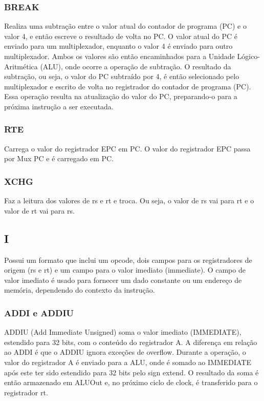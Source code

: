 \subsubsection{BREAK}

Realiza uma subtração entre o valor atual do contador de programa (PC) e o valor 4, e então escreve o resultado de volta no PC. O valor atual do PC é enviado para um multiplexador, enquanto o valor 4 é enviado para outro multiplexador. Ambos os valores são então encaminhados para a Unidade Lógico-Aritmética (ALU), onde ocorre a operação de subtração. O resultado da subtração, ou seja, o valor do PC subtraído por 4, é então selecionado pelo multiplexador e escrito de volta no registrador do contador de programa (PC). Essa operação resulta na atualização do valor do PC, preparando-o para a próxima instrução a ser executada.

\subsubsection{RTE}

Carrega o valor do registrador EPC em PC. O valor do registrador EPC passa por Mux PC e é carregado em PC.

\subsubsection{XCHG}

Faz a leitura dos valores de rs e rt e troca. Ou seja, o valor de rs vai para rt e o valor de rt vai para rs.

\newpage

\subsection{I}

Possui um formato que inclui um opcode, dois campos para os registradores de origem (rs e rt) e um campo para o valor imediato (immediate). O campo de valor imediato é usado para fornecer um dado constante ou um endereço de memória, dependendo do contexto da instrução.

\subsubsection{ADDI e ADDIU}

ADDIU (Add Immediate Unsigned) soma o valor imediato (IMMEDIATE), estendido para 32 bits, com o conteúdo do registrador A. A diferença em relação ao ADDI é que o ADDIU ignora exceções de overflow. Durante a operação, o valor do registrador A é enviado para a ALU, onde é somado ao IMMEDIATE após este ter sido estendido para 32 bits pelo sign extend. O resultado da soma é então armazenado em ALUOut e, no próximo ciclo de clock, é transferido para o registrador rt.

